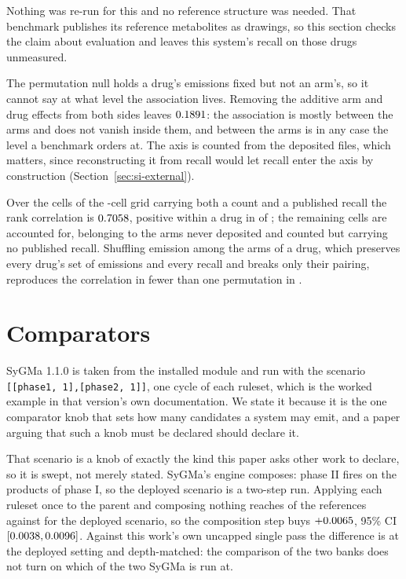 \documentclass[journal=jcisd8,manuscript=suppinfo,layout=onecolumn]{achemso}
\begin{document}
Nothing was re-run for this and no reference structure was needed. That benchmark publishes its
reference metabolites as drawings, so this section checks the claim about evaluation and leaves
this system's recall on those drugs unmeasured.


The permutation null holds a drug's emissions fixed but not an arm's, so it cannot say at what level
the
association lives. Removing the additive arm and drug effects from both sides leaves
$0.1891$: the association is mostly between the arms and does not vanish inside
them, and between the arms is in any case the level a benchmark orders at. The axis is counted from
the deposited files, which matters, since reconstructing it from recall would let recall enter the
axis by construction (Section~\ref{sec:si-external}).

Over the
\numExtbudgetCountedcells{} cells of the \numExtbudgetGrid{}-cell grid carrying both a count and a
published recall the rank correlation is $0.7058$, positive within a drug in
\numExtbudgetWithinpositive{} of \numExtbudgetWithinn{}; the remaining cells are accounted for,
\numExtbudgetAbsentnodeposit{} belonging to the \numExtbudgetArmsnotdepositedWord{} arms never
deposited and \numExtbudgetAbsentnorecallWord{} counted but carrying no published recall. Shuffling
emission among the arms of a drug, which preserves every drug's set of emissions and every recall
and breaks only their pairing, reproduces the correlation in fewer than one permutation in
\numExtbudgetPermutations{}.
\section{Comparators}
\label{sec:si-comparators}

SyGMa 1.1.0 is taken from the installed module and run with the scenario
\texttt{[[phase1,\,1],}\allowbreak\texttt{[phase2,\,1]]}, one cycle of each ruleset, which is
the worked example in that version's own documentation. We state it because it is the one comparator
knob that sets how many candidates a
system may emit, and a paper arguing that such a knob must be declared should declare it.

That scenario is a knob of exactly the kind this paper asks other work to declare, so it is swept,
not merely stated. SyGMa's engine composes: phase II fires on the products of phase I, so the
deployed scenario is a two-step run. Applying each ruleset once to the parent and composing nothing
reaches \numSygdepthOncepass{} of the references against \numSygdepthDeployed{} for the deployed
scenario, so the composition step buys $+0.0065$, 95\% CI $[0.0038,
0.0096]$. Against this work's own uncapped single pass the difference is
\numSygdepthGapdeployed{} at the deployed setting and \numSygdepthGapmatched{} depth-matched: the
comparison of the two banks does not turn on which of the two SyGMa is run at.
\end{document}

